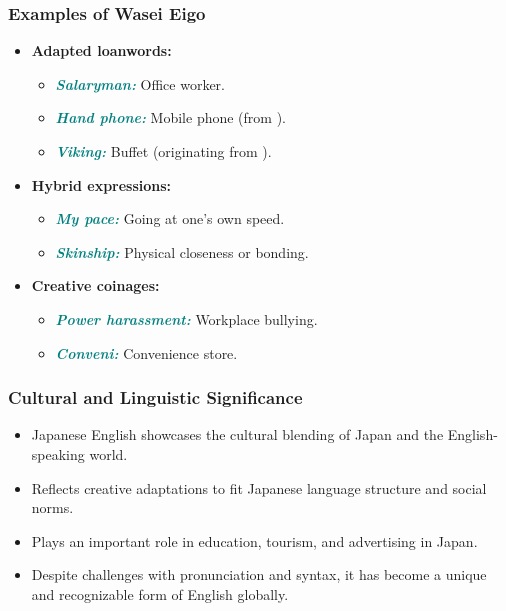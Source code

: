 \documentclass{beamer}
\renewcommand{\mtcitestyle}[1]{\textcolor{teal}{\textit{#1}}}
\newcommand{\lex}[1]{\textbf{\mtcitestyle{#1}}}
\begin{document}
\begin{frame}
\frametitle{Examples of Wasei Eigo}
\begin{itemize}
    \item \textbf{Adapted loanwords:}
    \begin{itemize}
        \item \lex{Salaryman:} Office worker.
        \item \lex{Hand phone:} Mobile phone (from ).
        \item \lex{Viking:} Buffet (originating from ).
    \end{itemize}
    \item \textbf{Hybrid expressions:}
    \begin{itemize}
        \item \lex{My pace:} Going at one's own speed.
        \item \lex{Skinship:} Physical closeness or bonding.
    \end{itemize}
    \item \textbf{Creative coinages:}
    \begin{itemize}
        \item \lex{Power harassment:} Workplace bullying.
        \item \lex{Conveni:} Convenience store.
    \end{itemize}
\end{itemize}
\end{frame}


\begin{frame}
\frametitle{Cultural and Linguistic Significance}
\begin{itemize}
    \item Japanese English showcases the cultural blending of Japan and the English-speaking world.
    \item Reflects creative adaptations to fit Japanese language structure and social norms.
    \item Plays an important role in education, tourism, and advertising in Japan.
    \item Despite challenges with pronunciation and syntax, it has become a unique and recognizable form of English globally.
\end{itemize}
\end{frame}
\end{document}
